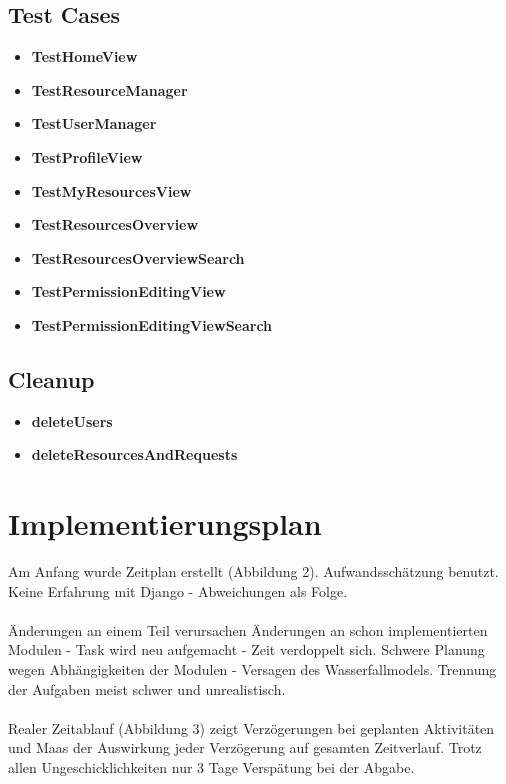 \documentclass[parskip=full,11pt]{scrartcl}
\begin{document}
\subsection*{Test Cases}
\begin{itemize}
\item \textbf{TestHomeView}
\item \textbf{TestResourceManager}
\item \textbf{TestUserManager}
\item \textbf{TestProfileView}
\item \textbf{TestMyResourcesView}
\item \textbf{TestResourcesOverview}
\item \textbf{TestResourcesOverviewSearch}
\item \textbf{TestPermissionEditingView}
\item \textbf{TestPermissionEditingViewSearch}

\end{itemize}
\subsection*{Cleanup}
\begin{itemize}
\item \textbf{deleteUsers}
\item \textbf{deleteResourcesAndRequests}
\end{itemize}

\newpage
\section{Implementierungsplan}
Am Anfang wurde Zeitplan erstellt (Abbildung 2). Aufwandsschätzung benutzt. Keine Erfahrung mit Django - Abweichungen als Folge.\\\\
Änderungen an einem Teil verursachen Änderungen an schon implementierten Modulen - Task wird neu aufgemacht - Zeit verdoppelt sich. Schwere Planung wegen Abhängigkeiten der Modulen - Versagen des Wasserfallmodels. Trennung der Aufgaben meist schwer und unrealistisch.\\\\ 
Realer Zeitablauf (Abbildung 3) zeigt Verzögerungen bei geplanten Aktivitäten und Maas der Auswirkung jeder Verzögerung auf gesamten Zeitverlauf. 
Trotz allen Ungeschicklichkeiten nur 3 Tage Verspätung bei der Abgabe.\\
\end{document}
